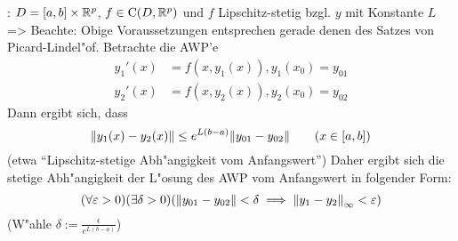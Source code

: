 \lessertheorem:
  $D=[a,b]\times\mathbb R^p$, $f\in{\rm C}(D,\mathbb R^p)$ und $f$ Lipschitz-stetig
  bzgl. $y$ mit Konstante $L$=>{
  Beachte: Obige Voraussetzungen entsprechen gerade denen des Satzes
  von Picard-Lindel"of.
  Betrachte die AWP'e
  \begin{align*}
    y_1'(x)&=f(x,y_1(x)),y_1(x_0)=y_{01}\\
    y_2'(x)&=f(x,y_2(x)),y_2(x_0)=y_{02}
    \end{align*}
  Dann ergibt sich, dass 
  \[{\left\| y_1(x)-y_2(x)\right\|}\leq e^{L(b-a)}{\left\| y_{01}-y_{02}\right\|}\qquad (x\in [a,b])
    \]
  (etwa ``Lipschitz-stetige Abh"angigkeit vom Anfangswert'')
  Daher ergibt sich die stetige Abh"angigkeit der L"osung des AWP vom
  Anfangswert in folgender Form:
  \[(\forall \varepsilon>0)(\exists \delta>0)({\left\| y_{01}-y_{02}\right\|}<\delta\implies
    {\left\| y_1-y_2\right\|}_\infty<\varepsilon)
    \]
  (W"ahle $\delta:=\frac\epsilon{e^{L(b-a)}}$)
  }
